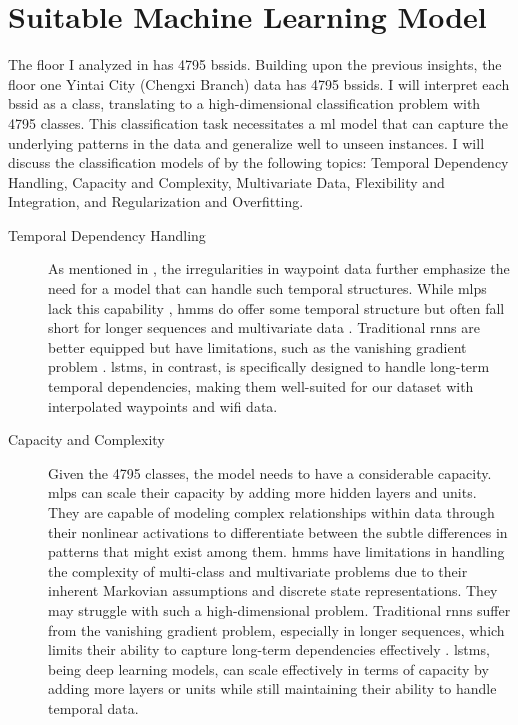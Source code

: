\chapter{Suitable Machine Learning Model}\label{ch:discuss-ml}

The floor I analyzed in  has 4795 \acp{bssid}.
Building upon the previous insights, the floor one Yintai City (Chengxi Branch) data has 4795 \acp{bssid}.
I will interpret each \ac{bssid} as a class, translating to a high-dimensional classification problem with 4795 classes.
This classification task necessitates a \ac{ml} model that can capture the underlying patterns in the data and generalize well to unseen instances.
I will discuss the classification models of  by the following topics: Temporal Dependency Handling, Capacity and Complexity, Multivariate Data, Flexibility and Integration, and Regularization and Overfitting. 

\begin{description}
\item[Temporal Dependency Handling]
As mentioned in , the irregularities in waypoint data further emphasize the need for a model that can handle such temporal structures.
While \acp{mlp} lack this capability \cite{mlp_and_nn}, \acp{hmm} do offer some temporal structure but often fall short for longer sequences and multivariate data \cite{hmm-rabiner-1989}.
Traditional \acp{rnn} are better equipped but have limitations, such as the vanishing gradient problem \cite{rnn_difficulties_2013}.
\acp{lstm}, in contrast, is specifically designed to handle long-term temporal dependencies, making them well-suited for our dataset with interpolated waypoints and \ac{wifi} data.
\end{description}

\begin{description}
\item[Capacity and Complexity]
Given the 4795 classes, the model needs to have a considerable capacity.
\acp{mlp} can scale their capacity by adding more hidden layers and units.
They are capable of modeling complex relationships within data through their nonlinear activations to differentiate between the subtle differences in patterns that might exist among them. 
\acp{hmm} have limitations in handling the complexity of multi-class and multivariate problems due to their inherent Markovian assumptions and discrete state representations. They may struggle with such a high-dimensional problem.
Traditional \acp{rnn} suffer from the vanishing gradient problem, especially in longer sequences, which limits their ability to capture long-term dependencies effectively \cite{rnn_difficulties_2013}.
\acp{lstm}, being deep learning models, can scale effectively in terms of capacity by adding more layers or units while still maintaining their ability to handle temporal data.
\end{description}

